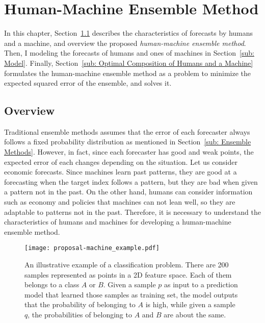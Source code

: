 \documentclass[../main.tex]{subfiles}
\begin{document}
\section{Human-Machine Ensemble Method}
\label{sec: Human-Machine Ensemble Method}

In this chapter, Section~\ref{sub: Overview} describes the characteristics of forecasts by humans and a machine, and overview the proposed \emph{human-machine ensemble method}.
Then, I modeling the forecasts of humans and ones of machines in Section~\ref{sub: Model}.
Finally, Section~\ref{sub: Optimal Composition of Humans and a Machine} formulates the human-machine ensemble method as a problem to minimize the expected squared error of the ensemble, and solves it.

\subsection{Overview}
\label{sub: Overview}

Traditional ensemble methods assumes that the error of each forecaster always follows a fixed probability distribution as mentioned in Section~\ref{sub: Ensemble Methods}.
However, in fact, since each forecaster has good and weak points, the expected error of each changes depending on the situation.
Let us consider economic forecasts.  Since machines learn past patterns, they are good at a forecasting when the target index follows a pattern, but they are bad when given a pattern not in the past.
On the other hand, humans can consider information such as economy and policies that machines can not lean well, so they are adaptable to patterns not in the past.
Therefore, it is necessary to understand the characteristics of humans and machines for developing a human-machine ensemble method.

\begin{figure}
  \centering
  \texttt{[image: proposal-machine\_example.pdf]}
  \caption{
    An illustrative example of a classification problem.
    There are 200 samples represented as points in a 2D feature space.
    Each of them belongs to a class $A$ or $B$.
    Given a sample $p$ as input to a prediction model that learned those samples as training set, the model outputs that the probability of belonging to $A$ is high, while given a sample $q$, the probabilities of belonging to $A$ and $B$ are about the same.
  }\label{fig: example}
\end{figure}
\end{document}
